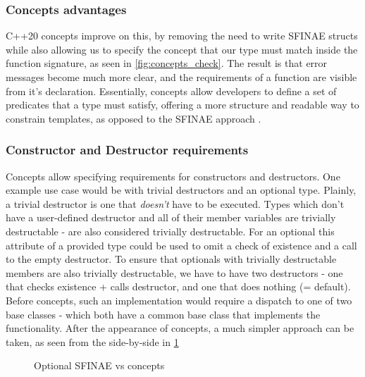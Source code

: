 \documentclass[
    english, %
]{VUMIFPSkursinis}
\begin{document}
\FloatBarrier
\subsubsection{Concepts advantages}

C++20 concepts improve on this, by removing the need to write SFINAE structs while also allowing us to specify the concept that our type must match inside the function signature, as seen in \cref{fig:concepts_check}. The result is that error messages become much more clear, and the requirements of a function are visible from it's declaration. Essentially, concepts allow developers to define a set of predicates that a type must satisfy, offering a more structure and readable way to constrain templates, as opposed to the SFINAE approach \cite{DSACPP}.


\FloatBarrier
\subsubsection{Constructor and Destructor requirements}

Concepts allow specifying requirements for constructors and destructors. One example use case would be with trivial destructors and an optional type. Plainly, a trivial destructor is one that \textit{doesn't} have to be executed. Types which don't have a user-defined destructor and all of their member variables are trivially destructable - are also considered
trivially destructable. For an optional this attribute of a provided type could be used to omit a check of existence and a call to the empty destructor. To ensure that optionals with
trivially destructable members are also trivially destructable, we have to have two destructors - one that checks existence + calls destructor, and one that does nothing (= default).
Before concepts, such an implementation would require a dispatch to one of two base classes - which both have a common base class that implements the functionality. After
the appearance of concepts, a much simpler approach can be taken, as seen from the side-by-side in \cref{fig:optional_impl}

\begin{figure}[!htbp]
    \begin{minipage}{0.55\textwidth}
        \centering
    \end{minipage}
    \begin{minipage}{0.45\textwidth}
        \centering
    \end{minipage}
    \caption{Optional SFINAE vs concepts}
    \label{fig:optional_impl}
\end{figure}
\end{document}
